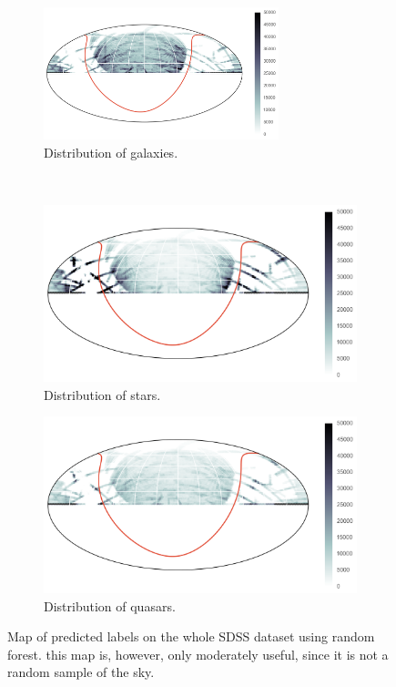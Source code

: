 \begin{figure}[p]
	\centering
	\begin{subfigure}{\textwidth}
		\centering
		\includegraphics[width=0.75\textwidth]{figures/4_expt1/map_prediction_forest_galaxies}
		\caption{Distribution of galaxies.}
		\label{fig:random1}
	\end{subfigure}\\
	\begin{subfigure}{\textwidth}
		\centering
		\includegraphics[width=0.75\linewidth]{figures/4_expt1/map_prediction_forest_stars}
		\caption{Distribution of stars.}
		\label{fig:random2}
	\end{subfigure}
	\begin{subfigure}{\textwidth}
		\centering
		\includegraphics[width=0.75\linewidth]{figures/4_expt1/map_prediction_forest_quasars}
		\caption{Distribution of quasars.}
		\label{fig:random3}
	\end{subfigure}
	\caption[Map of predicted labels on the whole SDSS dataset using random forest.]{
		Map of predicted labels on the whole SDSS dataset using random forest. this
		map is, however, only moderately useful, since it is not a random sample of the sky.}
	\label{fig:forest}
\end{figure}


